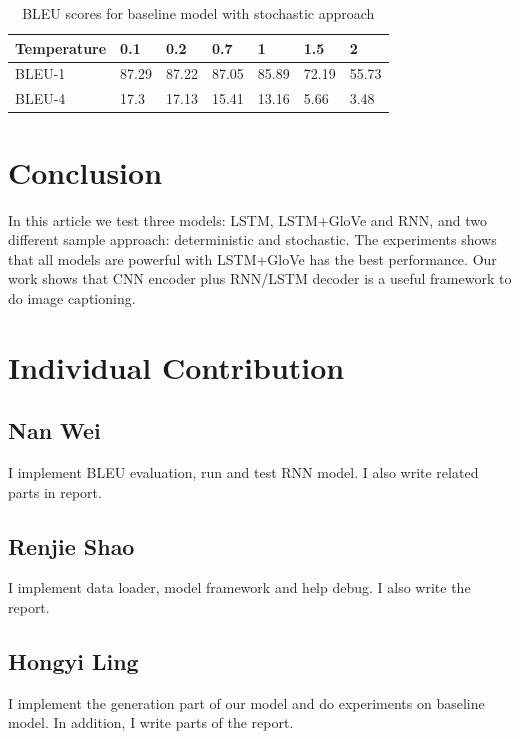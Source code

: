 \documentclass{article} %
\begin{document}
\begin{table}[htb!]
    \centering
    \begin{tabular}{l|l|l|l|l|l|l}
    \hline
    Temperature & 0.1   & 0.2   & 0.7   & 1     & 1.5   & 2     \\\hline
    BLEU-1      & 87.29 & 87.22 & 87.05 & 85.89 & 72.19 & 55.73 \\\hline
    BLEU-4      & 17.3  & 17.13 & 15.41 & 13.16 & 5.66  & 3.48 \\\hline
    \end{tabular}
    \caption{BLEU scores for baseline model with stochastic approach}
    \label{baseline_table}  
\end{table}

\section{Conclusion}

In this article we test three models: LSTM, LSTM+GloVe and RNN, and two different sample approach: deterministic and stochastic. The experiments shows that all models are powerful with LSTM+GloVe has the best performance. Our work shows that CNN encoder plus RNN/LSTM decoder is a useful framework to do image captioning.

\section{Individual Contribution}

\subsection*{Nan Wei}
I implement BLEU evaluation, run and test RNN model. I also write related parts in report.

\subsection*{Renjie Shao}
I implement data loader, model framework and help debug. I also write the report.
\subsection*{Hongyi Ling}
I implement the generation part of our model and do experiments on baseline model.  In addition, I write parts of the report.



\end{document}
